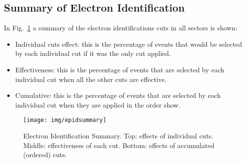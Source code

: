 \clearpage\newpage

\subsection{Summary of Electron Identification }
In Fig.~\ref{fig:epidsummary} a summary of the electron identifications cuts in all sectors is shown:

\begin{itemize}
    \item Individual cuts effect: this is the percentage of events that would be selected by each
    individual cut if it was the only cut applied.
    \item Effectiveness: this is the percentage of events that are selected by each individual cut when
    all the other cuts are effective.
    \item Cumulative: this is the percentage of events that are selected by each individual cut when
    they are applied in the order show.
\end{itemize}


\begin{figure}[hb]
    \centering
    \texttt{[image: img/epidsummary]}
    \caption{Electron Identification Summary. Top: effects of individual cuts.
    Middle: effectiveness of each cut.
    Bottom: effects of accumulated (ordered) cuts.}
    \label{fig:epidsummary}
\end{figure}













